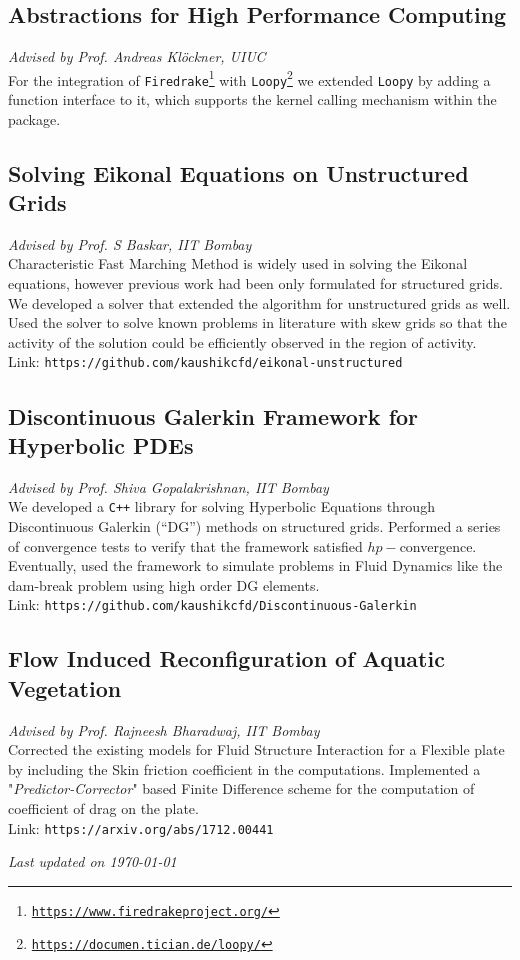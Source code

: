 \documentclass[letterpaper, 12pt]{article}
\newcommand{\updatenote}[1][\today]{\par\vfill{\scriptsize \textit{Last updated on #1}}}
\begin{document}
\subsection*{Abstractions for High Performance Computing}
\vspace{-1ex}
\small \textit{Advised by Prof. Andreas Kl\"{o}ckner, UIUC}\\
For the integration of
\texttt{Firedrake}\footnote{\texttt{\url{https://www.firedrakeproject.org/}}
} with \texttt{Loopy}\footnote{\texttt{\url{https://documen.tician.de/loopy/}}
} we extended \texttt{Loopy} by adding a function interface to it, which
supports the kernel calling mechanism within the package.

\subsection*{Solving Eikonal Equations on Unstructured Grids}
\vspace{-1ex}
\small \textit{Advised by Prof. S Baskar, IIT Bombay}\\
Characteristic Fast Marching Method is widely used in solving the Eikonal
equations, however previous work had been only formulated for structured
grids. We developed a solver that extended the algorithm for
unstructured grids as well. Used the solver to solve known problems in
literature with skew grids so that the activity of the solution could be
efficiently observed in the region of activity.\\
Link: \texttt{https://github.com/kaushikcfd/eikonal-unstructured}


\subsection*{Discontinuous Galerkin Framework for Hyperbolic PDEs}
\vspace{-1ex}
\small \textit{Advised by Prof. Shiva Gopalakrishnan, IIT Bombay}\\
We developed a \texttt{C++} library for solving Hyperbolic Equations through
Discontinuous Galerkin (``DG'') methods on structured grids.  Performed a series
of convergence tests to verify that the framework satisfied $hp-$convergence.
Eventually, used the framework to simulate problems in Fluid Dynamics like
the dam-break problem using high order DG elements.\\
Link: \texttt{https://github.com/kaushikcfd/Discontinuous-Galerkin}


\subsection*{Flow Induced Reconfiguration of Aquatic Vegetation}
\vspace{-1ex}
\small \textit{Advised by Prof. Rajneesh Bharadwaj, IIT Bombay}\\
Corrected the existing models for Fluid Structure Interaction for a Flexible plate by including the Skin friction coefficient in the computations. Implemented a "\textit{Predictor-Corrector}" based Finite Difference scheme for the computation of coefficient of drag on the plate.\\
Link: \texttt{https://arxiv.org/abs/1712.00441}


\updatenote
\end{document}
